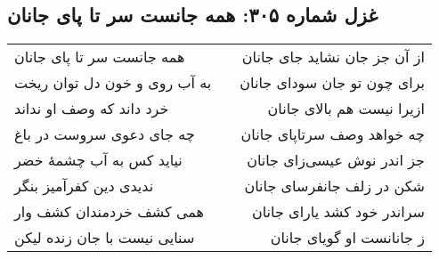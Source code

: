 \begin{center}
\section*{غزل شماره ۳۰۵: همه جانست سر تا پای جانان}
\label{sec:305}
\begin{longtable}{l p{0.5cm} r}
همه جانست سر تا پای جانان
&&
از آن جز جان نشاید جای جانان
\\
به آب روی و خون دل توان ریخت
&&
برای چون تو جان سودای جانان
\\
خرد داند که وصف او نداند
&&
ازیرا نیست هم بالای جانان
\\
چه جای دعوی سروست در باغ
&&
چه خواهد وصف سرتاپای جانان
\\
نیاید کس به آب چشمهٔ خضر
&&
جز اندر نوش عیسی‌زای جانان
\\
ندیدی دین کفرآمیز بنگر
&&
شکن در زلف جانفرسای جانان
\\
همی کشف خردمندان کشف وار
&&
سراندر خود کشد یارای جانان
\\
سنایی نیست با جان زنده لیکن
&&
ز جانانست او گویای جانان
\\
\end{longtable}
\end{center}
